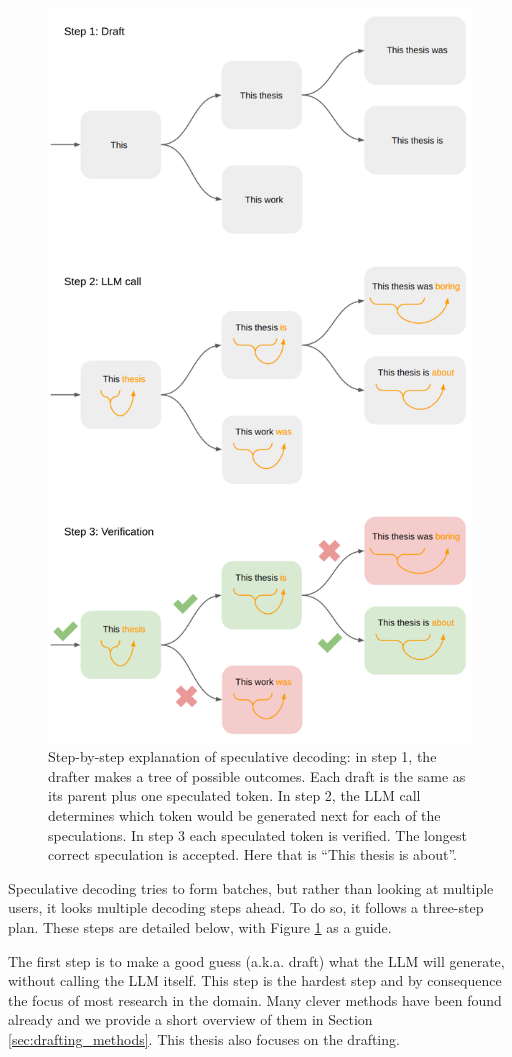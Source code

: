\begin{figure}[H]
	\centering
	\includegraphics[width=0.75\linewidth]{fig/spec_dec_three_step_plan.png}
	\caption{Step-by-step explanation of speculative decoding: in step 1, the drafter makes a tree of possible outcomes. Each draft is the same as its parent plus one speculated token. In step 2, the LLM call determines which token would be generated next for each of the speculations. In step 3 each speculated token is verified. The longest correct speculation is accepted. Here that is ``This thesis is about''.}
	\label{fig:spec_dec_three_step_plan}
\end{figure}

Speculative decoding tries to form batches, but rather than looking at multiple users, it looks multiple decoding steps ahead. To do so, it follows a three-step plan. These steps are detailed below, with Figure \ref{fig:spec_dec_three_step_plan} as a guide.

The first step is to make a good guess (a.k.a. draft) what the LLM will generate, without calling the LLM itself. This step is the hardest step and by consequence the focus of most research in the domain. Many clever methods have been found already and we provide a short overview of them in Section \ref{sec:drafting_methods}. This thesis also focuses on the drafting.

